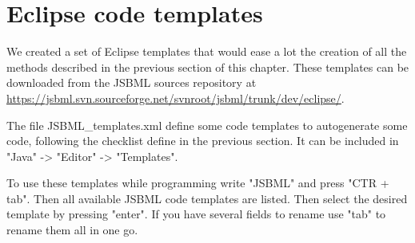 \section{Eclipse code templates}

We created a set of Eclipse templates that would ease a lot the creation of all 
the methods described in the previous section of this chapter. These templates
can be downloaded from the JSBML sources repository at 
\url{https://jsbml.svn.sourceforge.net/svnroot/jsbml/trunk/dev/eclipse/}.

The file JSBML\_templates.xml define some code templates to autogenerate some code, following the
checklist define in the previous section.
It can be included in "Java" -> "Editor" -> "Templates".

To use these templates while programming write "JSBML" and press "CTR + tab". Then all 
available JSBML code templates are listed. Then select the desired template by pressing 
"enter". If you have several fields to rename use "tab" to rename them all in one go.
